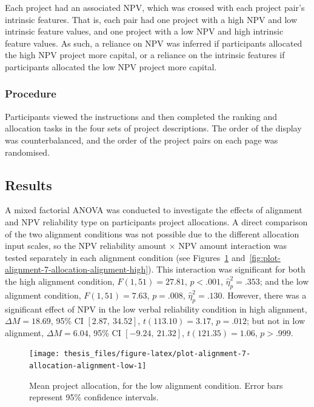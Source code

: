 \documentclass[a4paper, nobind, dvipsnames]{templates/ociamthesis}
\theoremstyle{definition}
\theoremstyle{definition}
\theoremstyle{definition}
\theoremstyle{definition}
\theoremstyle{remark}
\begin{document}
Each project had an associated NPV, which was crossed with each project pair's
intrinsic features. That is, each pair had one project with a high NPV and low
intrinsic feature values, and one project with a low NPV and high intrinsic
feature values. As such, a reliance on NPV was inferred if participants
allocated the high NPV project more capital, or a reliance on the intrinsic
features if participants allocated the low NPV project more capital.

\subsubsection{Procedure}

Participants viewed the instructions and then completed the ranking and
allocation tasks in the four sets of project descriptions. The order of the
display was counterbalanced, and the order of the project pairs on each page was
randomised.

\subsection{Results}

A mixed factorial ANOVA was conducted to investigate the effects of alignment
and NPV reliability type on participants project allocations. A direct
comparison of the two alignment conditions was not possible due to the different
allocation input scales, so the NPV reliability amount \(\times\) NPV amount
interaction was tested separately in each alignment condition (see
Figures~\ref{fig:plot-alignment-7-allocation-alignment-low}
and~\ref{fig:plot-alignment-7-allocation-alignment-high}). This interaction was
significant for both the high alignment condition,
\(F(1, 51) = 27.81\), \(p < .001\), \(\hat{\eta}^2_p = .353\);
and the low alignment condition,
\(F(1, 51) = 7.63\), \(p = .008\), \(\hat{\eta}^2_p = .130\).
However, there was a significant effect of NPV in the low verbal reliability
condition in high alignment,
\(\Delta M = 18.69\), 95\% CI \([2.87,~34.52]\), \(t(113.10) = 3.17\), \(p = .012\); but not in
low alignment,
\(\Delta M = 6.04\), 95\% CI \([-9.24,~21.32]\), \(t(121.35) = 1.06\), \(p > .999\).



\begin{figure}
\texttt{[image: thesis\_files/figure-latex/plot-alignment-7-allocation-alignment-low-1]} \caption{Mean project allocation, for the low alignment condition. Error bars represent 95\% confidence intervals.}\label{fig:plot-alignment-7-allocation-alignment-low}
\end{figure}
\end{document}
